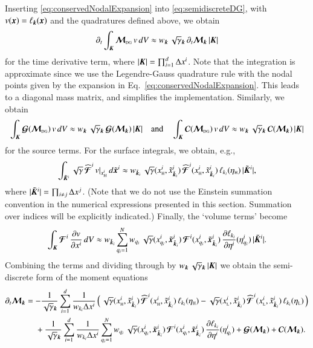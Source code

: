 \documentclass[11pt,letterpaper,twoside,english,final]{article}
\begin{document}
Inserting \eqref{eq:conservedNodalExpansion} into \eqref{eq:semidiscreteDG}, with $v(\boldsymbol{x})=\ell_{\boldsymbol{k}}(\boldsymbol{x})$ and the quadratures defined above, we obtain
\begin{equation}
  \partial_{t}{}\int_{\boldsymbol{K}}\boldsymbol{\mathcal{M}}_{\mbox{\tiny DG}}\,v\,dV
  \approx w_{\boldsymbol{k}}\,\sqrt{\gamma}_{\boldsymbol{k}}\,\partial_{t}{}\boldsymbol{\mathcal{M}}_{\boldsymbol{k}}\,|\boldsymbol{K}|
\end{equation}
for the time derivative term, where $|\boldsymbol{K}|=\prod_{i=1}^{d}\Delta x^{i}$.  
Note that the integration is approximate since we use the Legendre-Gauss quadrature rule with the nodal points given by the expansion in Eq.~\eqref{eq:conservedNodalExpansion}.  
This leads to a diagonal mass matrix, and simplifies the implementation.  
Similarly, we obtain
\begin{equation}
  \int_{\boldsymbol{K}}\boldsymbol{\mathcal{G}}(\boldsymbol{\mathcal{M}}_{\mbox{\tiny DG}})\,v\,dV
  \approx w_{\boldsymbol{k}}\,\sqrt{\gamma}_{\boldsymbol{k}}\,\boldsymbol{\mathcal{G}}(\boldsymbol{\mathcal{M}}_{\boldsymbol{k}})\,|\boldsymbol{K}| \quad\text{and}\quad
  \int_{\boldsymbol{K}}\boldsymbol{\mathcal{C}}(\boldsymbol{\mathcal{M}}_{\mbox{\tiny DG}})\,v\,dV
  \approx w_{\boldsymbol{k}}\,\sqrt{\gamma}_{\boldsymbol{k}}\,\boldsymbol{\mathcal{C}}(\boldsymbol{\mathcal{M}}_{\boldsymbol{k}})\,|\boldsymbol{K}|
\end{equation}
for the source terms.  
For the surface integrals, we obtain, e.g., 
\begin{equation}
  \int_{\tilde{\boldsymbol{K}}^{i}}\sqrt{\gamma}\,\widehat{\boldsymbol{\mathcal{F}}}^{i}\,v|_{x_{\mbox{\tiny H}}^{i}}\,d\tilde{\boldsymbol{x}}^{i}
  \approx w_{\tilde{\boldsymbol{k}}_{i}}\,\sqrt{\gamma}(x_{\mbox{\tiny H}}^{i},\tilde{x}_{\tilde{\boldsymbol{k}}_{i}}^{i})\,
  \widehat{\boldsymbol{\mathcal{F}}}^{i}(x_{\mbox{\tiny H}}^{i},\tilde{x}_{\tilde{\boldsymbol{k}}_{i}}^{i})\,\ell_{k_{i}}(\eta_{\mbox{\tiny H}})\,|\tilde{\boldsymbol{K}}^{i}|,
\end{equation}
where $|\tilde{\boldsymbol{K}}^{i}|=\prod_{i\ne j}\Delta x^{j}$.  
(Note that we do not use the Einstein summation convention in the numerical expressions presented in this section.  
Summation over indices will be explicitly indicated.)  
Finally, the `volume terms' become
\begin{equation}
  \int_{\boldsymbol{K}}\boldsymbol{\mathcal{F}}^{i}\,\frac{\partial v}{\partial x^{i}}\,dV
  \approx w_{\tilde{\boldsymbol{k}}_{i}}\sum_{q_{i}=1}^{N}w_{q_{i}}\,\sqrt{\gamma}(x_{q_{i}}^{i},\tilde{\boldsymbol{x}}_{\tilde{\boldsymbol{k}}_{i}}^{i})\,
  \boldsymbol{\mathcal{F}}^{i}(x_{q_{i}}^{i},\tilde{\boldsymbol{x}}_{\tilde{\boldsymbol{k}}_{i}}^{i})\,\frac{\partial \ell_{k_{i}}}{\partial \eta^{i}}(\eta_{q_{i}}^{i})\,|\tilde{\boldsymbol{K}}^{i}|.  
\end{equation}
Combining the terms and dividing through by $w_{\boldsymbol{k}}\,\sqrt{\gamma}_{\boldsymbol{k}}\,|\boldsymbol{K}|$ we obtain the semi-discrete form of the moment equations
\begin{align}
  \partial_{t}{\boldsymbol{\mathcal{M}}_{\boldsymbol{k}}}
  &=
  -\frac{1}{\sqrt{\gamma}_{\boldsymbol{k}}}\sum_{i=1}^{d} 
  \frac{1}{w_{k_{i}}\Delta x^{i}}\,
  \Big(\,
    \sqrt{\gamma}(x_{\mbox{\tiny H}}^{i},\tilde{x}_{\tilde{\boldsymbol{k}}_{i}}^{i})\,\widehat{\boldsymbol{\mathcal{F}}}^{i}(x_{\mbox{\tiny H}}^{i},\tilde{x}_{\tilde{\boldsymbol{k}}_{i}}^{i})\,\ell_{k_{i}}(\eta_{\mbox{\tiny H}})
    -\sqrt{\gamma}(x_{\mbox{\tiny L}}^{i},\tilde{x}_{\tilde{\boldsymbol{k}}_{i}}^{i})\,\widehat{\boldsymbol{\mathcal{F}}}^{i}(x_{\mbox{\tiny L}}^{i},\tilde{x}_{\tilde{\boldsymbol{k}}_{i}}^{i})\,\ell_{k_{i}}(\eta_{\mbox{\tiny L}})
  \,\Big)
  \nonumber \\
  &\hspace{12pt}
  +\frac{1}{\sqrt{\gamma}_{\boldsymbol{k}}}\sum_{i=1}^{d}\frac{1}{w_{k_{i}}\Delta x^{i}}
  \sum_{q_{i}=1}^{N}w_{q_{i}}\,\sqrt{\gamma}(x_{q_{i}}^{i},\tilde{\boldsymbol{x}}_{\tilde{\boldsymbol{k}}_{i}}^{i})\,
  \boldsymbol{\mathcal{F}}^{i}(x_{q_{i}}^{i},\tilde{\boldsymbol{x}}_{\tilde{\boldsymbol{k}}_{i}}^{i})\,\frac{\partial \ell_{k_{i}}}{\partial \eta^{i}}(\eta_{q_{i}}^{i})
  +\boldsymbol{\mathcal{G}}(\boldsymbol{\mathcal{M}}_{\boldsymbol{k}})+\boldsymbol{\mathcal{C}}(\boldsymbol{\mathcal{M}}_{\boldsymbol{k}}).
  \label{eq:semidiscreteDiscretized}
\end{align}
\end{document}

